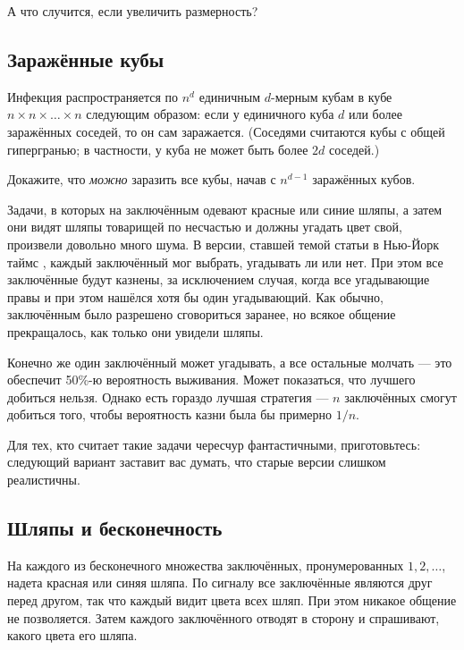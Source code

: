 А что случится, если увеличить размерность?

\subsection*{Заражённые кубы}

Инфекция распространяется по $n^d$ единичным $d$-мерным кубам в кубе $n \times n \times \dots \times n$ следующим образом: если у единичного куба $d$ или более заражённых соседей, то он сам заражается.
(Соседями считаются кубы с общей гипергранью; в частности, у куба не может быть более $2d$ соседей.)

Докажите, что \emph{можно} заразить все кубы, начав с $n^{d-1}$ заражённых кубов.

\medskip

Задачи, в которых на заключённым одевают красные или синие шляпы, а затем они видят шляпы товарищей по несчастью и должны угадать цвет свой, произвели довольно много шума.
В версии, ставшей темой статьи в Нью-Йорк таймс \cite{50}, каждый заключённый мог выбрать, угадывать ли или нет.
При этом все заключённые будут казнены, за исключением случая, когда все угадывающие правы и при этом нашёлся хотя бы один угадывающий.
Как обычно, заключённым было разрешено сговориться заранее, но всякое общение прекращалось, как только они увидели шляпы.

Конечно же один заключённый может угадывать, а все остальные молчать --- 
это обеспечит 50\%-ю вероятность выживания. 
Может показаться, что лучшего добиться нельзя.
Однако есть гораздо лучшая стратегия --- $n$ заключённых смогут добиться того, чтобы вероятность казни была бы примерно $1/n$.

Для тех, кто считает такие задачи чересчур фантастичными, приготовьтесь:
следующий вариант заставит вас думать, что старые версии слишком реалистичны.

\subsection*{Шляпы и бесконечность}\label{Шляпы и бесконечность}

На каждого из бесконечного множества заключённых, пронумерованных $1,2,\dots$, надета красная или синяя шляпа.
По сигналу все заключённые являются друг перед другом, так что каждый видит цвета всех шляп.
При этом никакое общение не позволяется.
Затем каждого заключённого отводят в сторону и спрашивают, какого цвета его шляпа.

